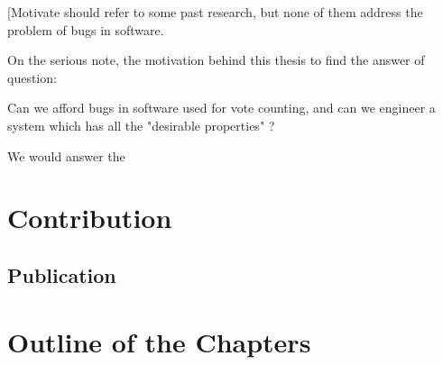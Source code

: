   
       
%   
  [Motivate should refer to some past research, but none of 
  them address the problem of bugs in software.  
  
  On the serious note, the motivation
  behind this thesis to find the answer of question:  
  
  Can we afford bugs in software used for vote counting, and 
  can we engineer a system which has all the "desirable properties" ?
  
  We would answer the 
  
    
      
 

\section{Contribution}

	\subsection{Publication}

\section{Outline of the Chapters}
%
%
%
%
%
%



